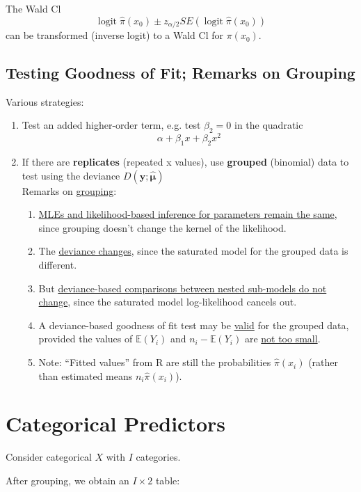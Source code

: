 \documentclass[11pt]{elegantbook}
\begin{document}
The Wald Cl
$$
\operatorname{logit} \hat{\pi}\left(x_0\right) \pm z_{\alpha / 2} S E\left(\operatorname{logit} \hat{\pi}\left(x_0\right)\right)
$$
can be transformed (inverse logit) to a Wald $\mathrm{Cl}$ for $\pi\left(x_0\right)$.

\subsection{Testing Goodness of Fit; Remarks on Grouping}
Various strategies:
\begin{enumerate}[$\bullet$]
    \item Test an added higher-order term, e.g. test $\beta_2 = 0$ in the quadratic $$\alpha + \beta_1 x + \beta_2 x^2$$
    \item If there are \textbf{replicates} (repeated x values), use \textbf{grouped}
    (binomial) data to test using the deviance $D(\boldsymbol{y} ; \hat{\boldsymbol{\mu}})$\\
    Remarks on \underline{grouping}:
    \begin{enumerate}[1.]
        \item \underline{MLEs and likelihood-based inference for parameters remain the same}, since grouping doesn't change the kernel of the likelihood.
        \item The \underline{deviance changes}, since the saturated model for the grouped data is different.
        \item But \underline{deviance-based comparisons between nested sub-models do not change}, since the saturated model log-likelihood cancels out.
        \item A deviance-based goodness of fit test may be \underline{valid} for the grouped data, provided the values of $\mathbb{E}(Y_i)$ and $n_i - \mathbb{E}(Y_i)$ are \underline{not too small}.
        \item Note: “Fitted values” from R are still the probabilities $\hat{\pi}(x_i)$ (rather than estimated means $n_i\hat{\pi}(x_i)$).
    \end{enumerate}
\end{enumerate}

\section{Categorical Predictors}
Consider categorical $X$ with $I$ categories.

After grouping, we obtain an $I \times 2$ table:
\end{document}
